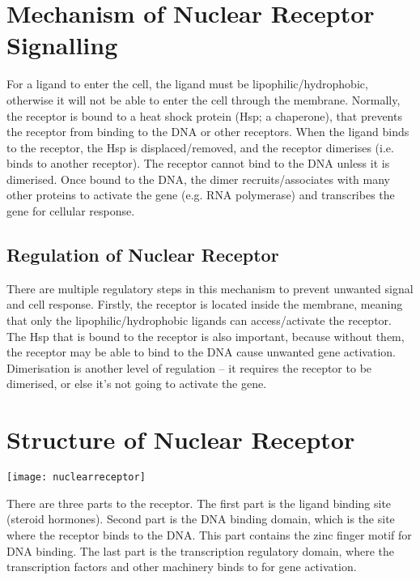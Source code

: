 \documentclass[a4paper, 12pt]{report}
\begin{document}
\section{Mechanism of Nuclear Receptor Signalling}

For a ligand to enter the cell, the ligand must be lipophilic/hydrophobic, otherwise it will not be able to enter the cell through the membrane.
Normally, the receptor is bound to a heat shock protein (Hsp; a chaperone), that prevents the receptor from binding to the DNA or other receptors.
When the ligand binds to the receptor, the Hsp is displaced/removed, and the receptor dimerises (i.e. binds to another receptor).
The receptor cannot bind to the DNA unless it is dimerised.
Once bound to the DNA, the dimer recruits/associates with many other proteins to activate the gene (e.g. RNA polymerase) and transcribes the gene for cellular response.

\subsection{Regulation of Nuclear Receptor}

There are multiple regulatory steps in this mechanism to prevent unwanted signal and cell response.
Firstly, the receptor is located inside the membrane, meaning that only the lipophilic/hydrophobic ligands can access/activate the receptor.
The Hsp that is bound to the receptor is also important, because without them, the receptor may be able to bind to the DNA cause unwanted gene activation.
Dimerisation is another level of regulation -- it requires the receptor to be dimerised, or else it's not going to activate the gene.

\section{Structure of Nuclear Receptor}

\begin{center}
\texttt{[image: nuclearreceptor]}
\end{center}

There are three parts to the receptor.
The first part is the ligand binding site (steroid hormones).
Second part is the DNA binding domain, which is the site where the receptor binds to the DNA.
This part contains the zinc finger motif for DNA binding.
The last part is the transcription regulatory domain, where the transcription factors and other machinery binds to for gene activation.
\end{document}
